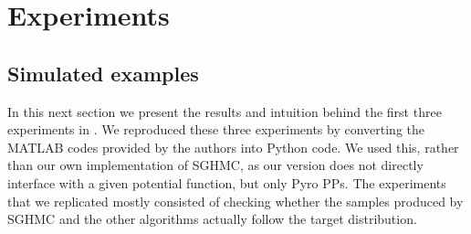
\section{Experiments}
\subsection{Simulated examples}
In this next section we present the results and intuition behind the first three experiments in \cite{sghmc}. We reproduced these three experiments by converting the MATLAB codes provided by the authors \citeauthor{sghmc} \cite{simu_code} into Python code. We used this, rather than our own implementation of SGHMC, as our version does not directly interface with a given potential function, but only Pyro PPs. The experiments that we replicated mostly consisted of checking whether the samples produced by SGHMC and the other algorithms actually follow the target distribution.

